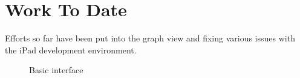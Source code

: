 \section{Work To Date}

Efforts so far have been put into the graph view and fixing various issues with the iPad development environment.

\begin{figure}[htb]
    \caption{\label{fig:first-screenshot} Basic interface}
\end{figure}
